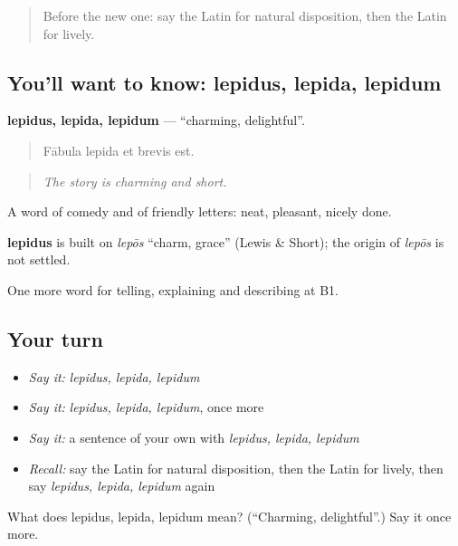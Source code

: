 \begin{quote}
Before the new one: say the Latin for natural disposition, then the Latin for lively.
\end{quote}

\subsection*{You'll want to know: lepidus, lepida, lepidum}
\textbf{lepidus, lepida, lepidum} — \textquotedblleft{}charming, delightful\textquotedblright{}.

\begin{quote}
Fābula lepida et brevis est.
\end{quote}

\begin{quote}
\emph{The story is charming and short.}
\end{quote}

A word of comedy and of friendly letters: neat, pleasant, nicely done.

\begin{cousinweb}
\textbf{lepidus} is built on \emph{lepōs} \textquotedblleft{}charm, grace\textquotedblright{} (Lewis \& Short); the origin of \emph{lepōs} is not settled.
\end{cousinweb}

\begin{grammarlens}[title={What you've built}]
One more word for telling, explaining and describing at B1.
\end{grammarlens}

\subsection*{Your turn}
\begin{itemize}
\raggedright
  \item \emph{Say it:} \emph{lepidus, lepida, lepidum}
  \item \emph{Say it:} \emph{lepidus, lepida, lepidum}, once more
  \item \emph{Say it:} a sentence of your own with \emph{lepidus, lepida, lepidum}
  \item \emph{Recall:} say the Latin for natural disposition, then the Latin for lively, then say \emph{lepidus, lepida, lepidum} again
\end{itemize}

\begin{tcolorbox}[breakable,colback=teal!4,colframe=teal!35!black,title={Before you move on}]
What does lepidus, lepida, lepidum mean? (\textquotedblleft{}Charming, delightful\textquotedblright{}.) Say it once more.
\end{tcolorbox}
